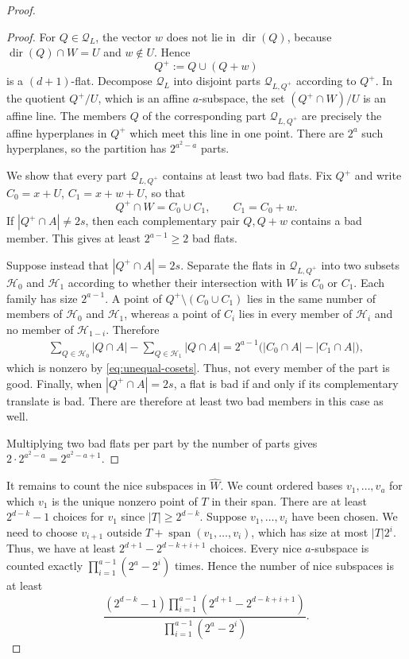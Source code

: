 \documentclass[10pt,a4paper]{amsart}
\newcommand{\cQ}{\mathcal Q}
\newcommand{\cH}{\mathcal H}
\DeclareMathOperator{\Span}{span}
\DeclareMathOperator{\dir}{dir}
\begin{document}
\begin{proof}
\begin{proof}
For $Q\in\cQ_L$, the vector $w$ does not lie in $\dir(Q)$, because
$\dir(Q)\cap W=U$ and $w\notin U$.  Hence
\[Q^+:=Q\cup(Q+w)\]
is a $(d+1)$-flat. Decompose $\cQ_L$ into disjoint parts $\cQ_{L, Q^+}$ according to $Q^+$.  In the
quotient $Q^+/U$, which is an affine $a$-subspace, the set
$(Q^+\cap W)/U$ is an affine line.  The members $Q$ of the corresponding
part $\cQ_{L, Q^+}$ are precisely the affine hyperplanes in $Q^+$ which meet this line in one
point. There are $2^a$ such hyperplanes, so the partition has $2^{a^2-a}$ parts.

We show that every part $\cQ_{L, Q^+}$ contains at least two bad flats.  Fix $Q^+$ and
write $C_0 = x+U$, $C_1 = x+w+U$, so that
\[
  Q^+\cap W=C_0\cup C_1,
  \qquad C_1=C_0+w.
\]
If
$|Q^+\cap A|\ne 2s$, then each complementary pair
$Q,Q+w$ contains a bad member.  This gives at least
$2^{a-1}\ge2$ bad flats.

Suppose instead that $|Q^+\cap A|=2s$.  Separate the flats in $\cQ_{L, Q^+}$
into two subsets $\cH_0$ and $\cH_1$ according to whether their intersection with
$W$ is $C_0$ or $C_1$.  Each family has size $2^{a-1}$.  A point of
$Q^+\setminus(C_0\cup C_1)$ lies in the same number of members of
$\cH_0$ and $\cH_1$, whereas a point of $C_i$ lies in every member of
$\cH_i$ and no member of $\cH_{1-i}$.  Therefore
\[
\begin{split}
  \sum_{Q\in\cH_0}|Q\cap A|
  -\sum_{Q\in\cH_1}|Q\cap A|
  =2^{a-1}\bigl(|C_0\cap A|-|C_1\cap A|\bigr),
\end{split}
\]
which is nonzero by \eqref{eq:unequal-cosets}.  Thus, not every member
of the part is good.  Finally, when $|Q^+\cap A|=2s$, a flat is bad if
and only if its complementary translate is bad.  There are therefore
at least two bad members in this case as well.

Multiplying two bad flats per part by the number of parts gives
$2\cdot2^{a^2-a}=2^{a^2-a+1}$.
\end{proof}

It remains to count the nice subspaces in $\widehat W$. We count ordered bases $v_1,\ldots,v_a$ for which $v_1$ is the unique nonzero point of $T$ in
their span. There are at least $2^{d-k}-1$ choices for $v_1$ since $|T|\ge 2^{d-k}$. Suppose $v_1,\ldots,v_i$ have been chosen.
We need to choose $v_{i+1}$ outside $T+\Span(v_1,\ldots,v_i)$, which has size at most $|T|2^i$. Thus, we have at least $2^{d+1}-2^{d-k+i+1}$ choices. Every nice $a$-subspace is counted exactly $\prod_{i=1}^{a-1}(2^a-2^i)$ times. Hence the number of nice subspaces is at least
\begin{equation}\label{eq:nice-count}
  \frac{(2^{d-k}-1)
    \prod_{i=1}^{a-1}(2^{d+1}-2^{d-k+i+1})}
  {\prod_{i=1}^{a-1}(2^a-2^i)}.
\end{equation}


\end{proof}
\end{document}
